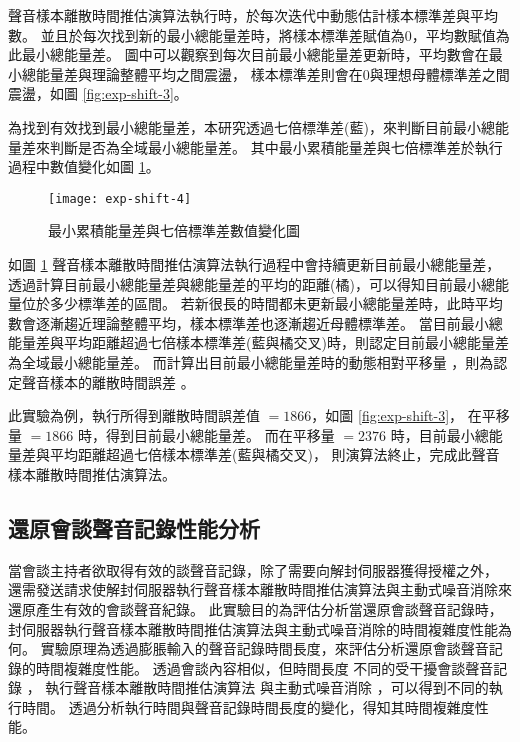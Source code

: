     聲音樣本離散時間推估演算法執行時，於每次迭代中動態估計樣本標準差與平均數。
並且於每次找到新的最小總能量差時，將樣本標準差賦值為$0$，平均數賦值為此最小總能量差。
圖中可以觀察到每次目前最小總能量差更新時，平均數會在最小總能量差與理論整體平均之間震盪，
樣本標準差則會在$0$與理想母體標準差之間震盪，如圖 \ref{fig:exp-shift-3}。

    為找到有效找到最小總能量差，本研究透過七倍標準差(藍)，來判斷目前最小總能量差來判斷是否為全域最小總能量差。
其中最小累積能量差與七倍標準差於執行過程中數值變化如圖 \ref{fig:exp-shift-4}。

\begin{figure}[H]
    \centering
    \texttt{[image: exp-shift-4]}
    \caption{最小累積能量差與七倍標準差數值變化圖}\label{fig:exp-shift-4}
\end{figure}

    如圖 \ref{fig:exp-shift-4} 聲音樣本離散時間推估演算法執行過程中會持續更新目前最小總能量差，
透過計算目前最小總能量差與總能量差的平均的距離(橘)，可以得知目前最小總能量位於多少標準差的區間。
若新很長的時間都未更新最小總能量差時，此時平均數會逐漸趨近理論整體平均，樣本標準差也逐漸趨近母體標準差。
當目前最小總能量差與平均距離超過七倍樣本標準差(藍與橘交叉)時，則認定目前最小總能量差為全域最小總能量差。
而計算出目前最小總能量差時的動態相對平移量 \DEFcandiSFT，則為認定聲音樣本的離散時間誤差 \DEFshift。

    此實驗為例，執行所得到離散時間誤差值 \DEFshift $=1866$，如圖 \ref{fig:exp-shift-3}，
在平移量 \DEFcandiSFT $=1866$ 時，得到目前最小總能量差。
而在平移量 \DEFcandiSFT $=2376$ 時，目前最小總能量差與平均距離超過七倍樣本標準差(藍與橘交叉)，
則演算法終止，完成此聲音樣本離散時間推估演算法。


\subsection{還原會談聲音記錄性能分析}\label{subsec:exp-perform}

    當會談主持者欲取得有效的談聲音記錄，除了需要向解封伺服器獲得授權之外，
還需發送請求使解封伺服器執行聲音樣本離散時間推估演算法與主動式噪音消除來還原產生有效的會談聲音紀錄。
此實驗目的為評估分析當還原會談聲音記錄時，封伺服器執行聲音樣本離散時間推估演算法與主動式噪音消除的時間複雜度性能為何。
實驗原理為透過膨脹輸入的聲音記錄時間長度，來評估分析還原會談聲音記錄的時間複雜度性能。
透過會談內容相似，但時間長度 \DEFtimeREC 不同的受干擾會談聲音記錄 \DEFrecJ，
執行聲音樣本離散時間推估演算法 \DEFfuncEstm{} 與主動式噪音消除 \DEFfuncAnc{}，可以得到不同的執行時間。
透過分析執行時間與聲音記錄時間長度的變化，得知其時間複雜度性能。

